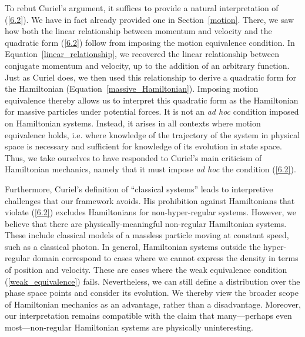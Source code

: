 \documentclass[12pt, twoside]{article}
\begin{document}
To rebut Curiel's argument, it suffices to provide a natural interpretation of (\ref{6.2}). We have in fact already provided one in Section~\ref{motion}. There, we saw how both the linear relationship between momentum and velocity and the quadratic form (\ref{6.2}) follow from imposing the motion equivalence condition. In Equation~\ref{linear_relationship}, we recovered the linear relationship between conjugate momentum and velocity, up to the addition of an arbitrary function. Just as Curiel does, we then used this relationship to derive a quadratic form for the Hamiltonian (Equation~\ref{massive_Hamiltonian}). Imposing motion equivalence thereby allows us to interpret this quadratic form as the Hamiltonian for massive particles under potential forces. It is not an \textit{ad hoc} condition imposed on Hamiltonian systems. Instead, it arises in all contexts where motion equivalence holds, i.e. where knowledge of the trajectory of the system in physical space is necessary and sufficient for knowledge of its evolution in state space. Thus, we take ourselves to have responded to Curiel's main criticism of Hamiltonian mechanics, namely that it must impose \textit{ad hoc} the condition (\ref{6.2}). 

Furthermore, Curiel's definition of ``classical systems'' leads to interpretive challenges that our framework avoids. His prohibition against Hamiltonians that violate (\ref{6.2}) excludes Hamiltonians for non-hyper-regular systems. However, we believe that there are physically-meaningful non-regular Hamiltonian systems. These include classical models of a massless particle moving at constant speed, such as a classical photon. In general, Hamiltonian systems outside the hyper-regular domain correspond to cases where we cannot express the density in terms of position and velocity. These are cases where the weak equivalence condition (\ref{weak_equivalence}) fails. Nevertheless, we can still define a distribution over the phase space points and consider its evolution. We thereby view the broader scope of Hamiltonian mechanics as an advantage, rather than a disadvantage. Moreover, our interpretation remains compatible with the claim that many---perhaps even most---non-regular Hamiltonian systems are physically uninteresting.
\end{document}
